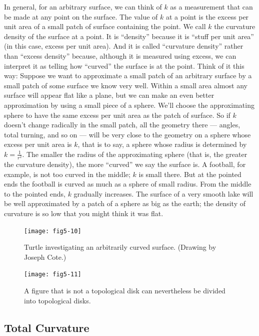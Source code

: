 \documentclass{book}
\begin{document}
In general, for an arbitrary surface, we can think of $k$ as a measurement
that can be made at any point on the surface. The value of $k$ at a
point is the excess per unit area of a small patch of surface containing
the point. We call $k$ the curvature density of the surface at a point. It is
``density'' because it is ``stuff per unit area'' (in this case, excess per unit
area). And it is called ``curvature density'' rather than ``excess density''
because, although it is measured using excess, we can interpret it as
telling how ``curved'' the surface is at the point. Think of it this way:
Suppose we want to approximate a small patch of an arbitrary surface
by a small patch of some surface we know very well. Within a small
area almost any surface will appear flat like a plane, but we can make
an even better approximation by using a small piece of a sphere. We'll
choose the approximating sphere to have the same excess per unit area
as the patch of surface. So if $k$ doesn't change radically in the small
patch, all the geometry there --- angles, total turning, and so on --- will be
very close to the geometry on a sphere whose excess per unit area is $k$,
that is to say, a sphere whose radius is determined by $k = \frac{1}{r^2}$. The
smaller the radius of the approximating sphere (that is, the greater the
curvature density), the more ``curved'' we say the surface is. A football,
for example, is not too curved in the middle; $k$ is small there. But at the
pointed ends the football is curved as much as a sphere of small radius.
From the middle to the pointed ends, $k$ gradually increases. The surface
of a very smooth lake will be well approximated by a patch of a sphere
as big as the earth; the density of curvature is so low that you might
think it was flat.

\begin{figure}
\begin{center}
\texttt{[image: fig5-10]}
\caption{Turtle investigating an arbitrarily curved surface. (Drawing by Joseph Cote.)}
\end{center}
\end{figure}

\begin{figure}
\begin{center}
\texttt{[image: fig5-11]}
\caption{A figure that is not a topological disk can nevertheless be divided into topological disks.}
\end{center}
\end{figure}

\subsection{Total Curvature}
\end{document}
